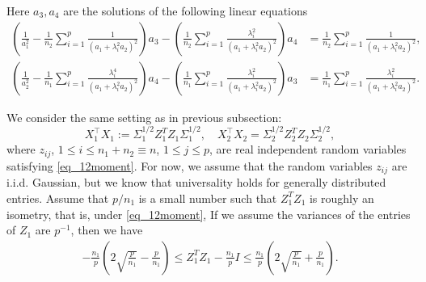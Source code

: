 \begin{lemma}
	Here $a_3, a_4$ are the solutions of the following linear equations
	\begin{align}
		\left( \frac1{a_1^2}- \frac1{n_2}\sum_{i=1}^p \frac{1}{ (a_1 + \lambda_i^2a_2)^2  }\right) a_3 -  \left(\frac1{n_2}\sum_{i=1}^p \frac{  \lambda_i^2 }{ (  a_1 + \lambda_i^2a_2)^2  }\right)a_4 &=  \frac1{n_2}\sum_{i=1}^p \frac{1 }{ (  a_1 + \lambda_i^2a_2)^2  } , \label{eq_a3} \\
		\left( \frac1{a_2^2} -  \frac1{n_1}\sum_{i=1}^p \frac{\lambda_i^4   }{  (a_1 + \lambda_i^2a_2)^2  }\right)a_4 -\left( \frac1 {n_1}\sum_{i=1}^p \frac{\lambda_i^2  }{  (a_1 + \lambda_i^2a_2)^2  }\right)a_3 &=   \frac1 {n_1}\sum_{i=1}^p \frac{\lambda_i^2 }{  (a_1 + \lambda_i^2a_2)^2  }. \label{eq_a4}
	\end{align}
\end{lemma}

We consider the same setting as in previous subsection: 
$$ X_1^{\top}X_1:=\Sigma_1^{1/2}  Z_1^T Z_1 \Sigma_1^{1/2} ,\quad X_2^{\top}X_2= \Sigma_2^{1/2}  Z_2^T Z_2 \Sigma_2^{1/2},$$
where $z_{ij}$, $1 \leq i \leq n_1+n_2\equiv n$, $1 \leq j \leq p$, are real independent random variables satisfying \eqref{eq_12moment}. For now, we assume that the random variables $z_{ij}$ are i.i.d. Gaussian, but we know that universality holds for generally distributed entries. Assume that $p/n_1$ is a small number such that $Z_1^TZ_1$ is roughly an isometry, that is, under \eqref{eq_12moment}, 
{\color{blue}
If we assume the variances of the entries of $Z_1$ are $p^{-1}$, then we have
\begin{align}
-\frac{n_1}{p}\left(2\sqrt{\frac{p}{n_1}} - {\frac{p}{n_1}}\right)  \le Z_1^T Z_1 -  \frac{n_1}{p} I  \le \frac{n_1}{p}\left(2\sqrt{\frac{p}{n_1}} + {\frac{p}{n_1}}\right) .
\end{align}
}

